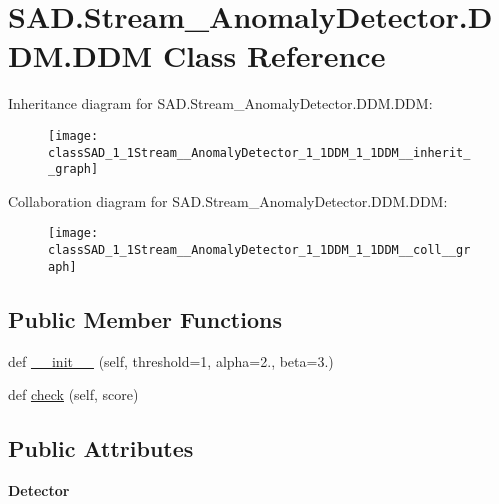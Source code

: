 \hypertarget{classSAD_1_1Stream__AnomalyDetector_1_1DDM_1_1DDM}{}\section{S\+A\+D.\+Stream\+\_\+\+Anomaly\+Detector.\+D\+D\+M.\+D\+DM Class Reference}
\label{classSAD_1_1Stream__AnomalyDetector_1_1DDM_1_1DDM}


Inheritance diagram for S\+A\+D.\+Stream\+\_\+\+Anomaly\+Detector.\+D\+D\+M.\+D\+DM\+:\nopagebreak
\begin{figure}[H]
\begin{center}
\leavevmode
\texttt{[image: classSAD\_1\_1Stream\_\_AnomalyDetector\_1\_1DDM\_1\_1DDM\_\_inherit\_\_graph]}
\end{center}
\end{figure}


Collaboration diagram for S\+A\+D.\+Stream\+\_\+\+Anomaly\+Detector.\+D\+D\+M.\+D\+DM\+:\nopagebreak
\begin{figure}[H]
\begin{center}
\leavevmode
\texttt{[image: classSAD\_1\_1Stream\_\_AnomalyDetector\_1\_1DDM\_1\_1DDM\_\_coll\_\_graph]}
\end{center}
\end{figure}
\subsection*{Public Member Functions}
\begin{DoxyCompactItemize}
\item 
def \hyperlink{classSAD_1_1Stream__AnomalyDetector_1_1DDM_1_1DDM_a1cb03342401690d45ffa9e7981d37d38}{\+\_\+\+\_\+init\+\_\+\+\_\+} (self, threshold=1, alpha=2., beta=3.)
\item 
def \hyperlink{classSAD_1_1Stream__AnomalyDetector_1_1DDM_1_1DDM_ae2afdf68bb18604f54496559f3d3577a}{check} (self, score)
\end{DoxyCompactItemize}
\subsection*{Public Attributes}
\begin{DoxyCompactItemize}
\item 
{\bfseries Detector}\hypertarget{classSAD_1_1Stream__AnomalyDetector_1_1DDM_1_1DDM_acf042d7d556742c3573344d08539ab95}{}\label{classSAD_1_1Stream__AnomalyDetector_1_1DDM_1_1DDM_acf042d7d556742c3573344d08539ab95}

\end{DoxyCompactItemize}


